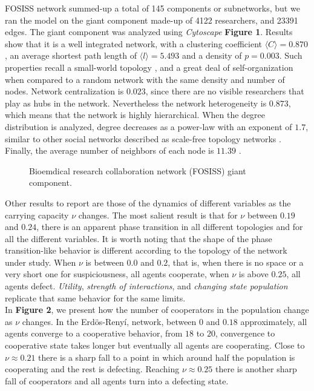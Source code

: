\documentclass{bmcart}
\def\texttt{[image: ]}
\begin{document}
FOSISS network summed-up a total of 145 components or subnetworks, but we ran
the model on the giant component made-up of 4122 researchers, and 23391 edges.
The giant component was analyzed using \textit{Cytoscape} \textbf{Figure
  1}. Results show that it is a well integrated network, with a clustering
coefficient $\langle C \rangle = 0.870$, an average shortest path length of
$\langle l \rangle = 5.493$  and a density of $p = 0.003$. Such properties
recall a small-world topology \cite{WattsStrogatz:98}, and a great deal of
self-organization when compared to a random network with the same density and
number of nodes. Network centralization is $0.023$, since there are no visible
researchers that play as hubs in the network. Nevertheless the network
heterogeneity is $0.873$, which means that the network is highly
hierarchical. When the degree distribution is analyzed, degree decreases as a
power-law with an exponent of $1.7$, similar to other social networks described
as scale-free topology networks \cite{BarabasiAlbert:99}. Finally, the average number
of neighbors of each node is $11.39$ \cite{Shannon:2003}.\\


\begin{figure} [h!]
\centering
\caption{Bioemdical research collaboration network (FOSISS) giant component.}\label{Fosiss_GC}
\end{figure}


Other results to report are those of the dynamics of different
variables as the carrying capacity $\nu$ changes. The  most salient
result is that for $\nu$ between $0.19$ and $0.24$, there is an
apparent phase transition in all different topologies and for all the
different variables. It is worth noting that the shape
of the phase transition-like behavior is different according to the topology of the
network under study. When $\nu$ is between $0.0$ and $0.2$, that is, when there is
no space or a very short one for suspiciousness, all agents cooperate, when
$\nu$ is above $0.25$, all agents defect. \textit{Utility},
\textit{strength of interactions}, and \textit{changing state population}
replicate that same behavior for the same limits. \\ 

In \textbf{Figure 2}, we present how the number of cooperators in the population
change as $\nu$ changes. In the Erd\"{o}s-Reny\'i, network, between $0$ and
$0.18$ approximately, all agents converge to a cooperative behavior, from $18$
to $20$, convergence to cooperative state takes longer but eventually all agents
are cooperating. Close to $\nu \approx 0.21$ there is a sharp fall to a point in
which around half the population is cooperating and the rest is
defecting. Reaching $\nu \approx 0.25$ there is another sharp fall of
cooperators and all agents turn into a defecting state.\\
\end{document}
